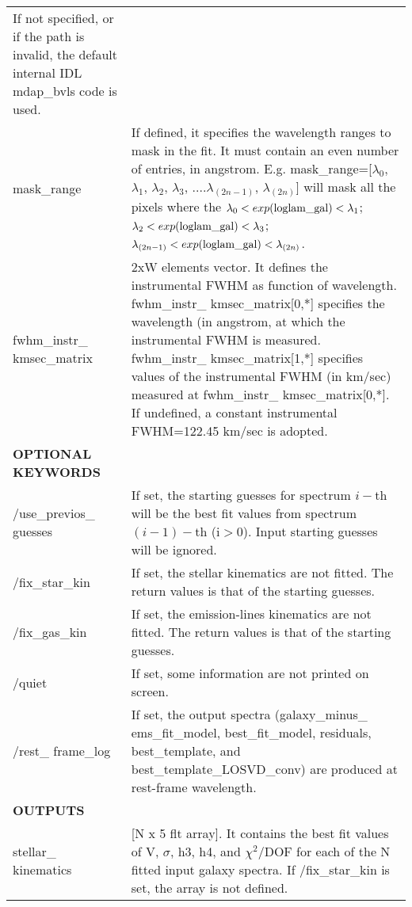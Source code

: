 \begin{center}
\begin{longtable}{p{2.7cm}| p{11.1cm}}
                  If not specified, or if the path is invalid, the default internal IDL mdap\_bvls code is used. \\
%
mask\_range  & If defined, it specifies the wavelength ranges to mask in the fit. It must contain an even number of entries, in
           angstrom. E.g. mask\_range=[$\lambda_0$, $\lambda_1$, $\lambda_2$, $\lambda_3$, ....$\lambda_{(2n-1)}$, $\lambda_{(2n)}$] will mask all the pixels where the 
             $\lambda_0 < exp({\rm loglam\_gal}) <\lambda_1$; $\lambda_2 < exp({\rm loglam\_gal}) <\lambda_3$;  $\lambda_{(2n-1)} < exp({\rm loglam\_gal}) <\lambda_{(2n)}$.\\
%
fwhm\_instr\_ kmsec\_matrix & 2xW elements vector. It defines the instrumental FWHM as function of wavelength. 
                               fwhm\_instr\_ kmsec\_matrix[0,*] specifies the wavelength (in angstrom, at which the instrumental FWHM is measured. 
                               fwhm\_instr\_ kmsec\_matrix[1,*] specifies values of the instrumental FWHM (in km/sec) measured at fwhm\_instr\_ kmsec\_matrix[0,*]. 
                               If undefined, a constant instrumental FWHM=122.45 km/sec is adopted. \\
\hline 
 {\bf OPTIONAL KEYWORDS}  &  \\
\hline
 /use\_previos\_ guesses &  If set, the starting guesses for spectrum $i-$th
                       will be the best fit values from spectrum
                      $(i-1)-$th (i$>0$). Input starting guesses will be ignored.\\
 /fix\_star\_kin  &        If set, the stellar kinematics are not
                       fitted. The return values is that of the starting guesses. \\
%
 /fix\_gas\_kin   &        If set, the emission-lines kinematics are not fitted. The return values is that of the starting guesses. \\
%
/quiet     &            If set, some information are not printed on screen.\\
%
/rest\_ frame\_log & If set, the output spectra (galaxy\_minus\_ ems\_fit\_model, best\_fit\_model, residuals, 
             best\_template, and best\_template\_LOSVD\_conv) are produced at rest-frame wavelength.\\
\hline
%
 {\bf OUTPUTS} &  \\
\hline
  stellar\_ kinematics   &  [N x 5 flt array].  It contains the best fit values of V, $\sigma$, h3, h4, and $\chi^2$/DOF for each of the N fitted input galaxy spectra. If /fix\_star\_kin is set, the array is not defined.\\

\end{longtable}
\end{center}
